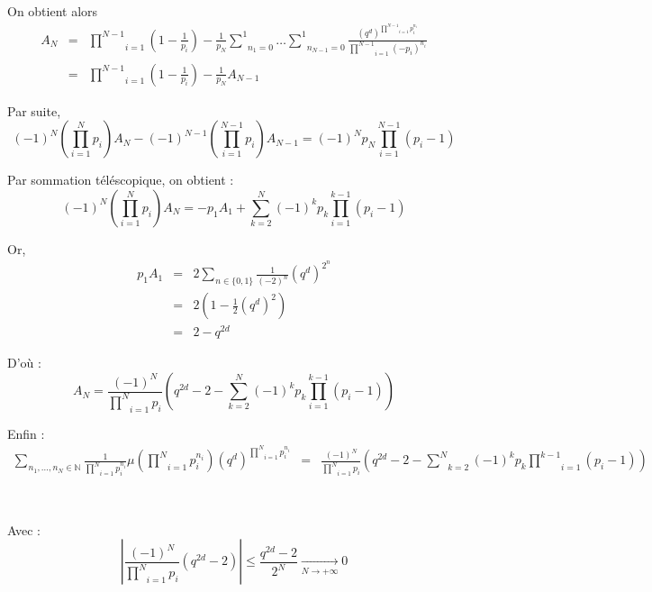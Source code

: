 On obtient alors
\begin{eqnarray*}
  A_N & = & \underset{i = 1}{\overset{N - 1}{\prod}} \left( 1 - \frac{1}{p_i}
  \right) - \frac{1}{p_N} \underset{n_1 = 0}{\overset{1}{\sum}} \ldots
  \underset{n_{N - 1} = 0}{\overset{1}{\sum}} \frac{{(q^d)^{\underset{i =
  1}{\overset{N - 1}{\prod}} p^{n_i}_i}} }{\underset{}{\underset{i =
  1}{\overset{N - 1}{\prod}}} (- p_i)^{n_i}}\\
  & = & \underset{i = 1}{\overset{N - 1}{\prod}} \left( 1 - \frac{1}{p_i}
  \right) - \frac{1}{p_N} A_{N - 1}
\end{eqnarray*}


Par suite,
\[ (- 1)^N \left( \underset{i = 1}{\overset{N}{\prod}} p_i \right) A_N - (-
   1)^{N - 1} \left( \underset{i = 1}{\overset{N - 1}{\prod}} p_i \right) A_{N
   - 1} = (- 1)^N p_N \underset{i = 1}{\overset{N - 1}{\prod}} (p_i - 1) \]


Par sommation t{\'e}l{\'e}scopique, on obtient :
\[ (- 1)^N \left( \underset{i = 1}{\overset{N}{\prod}} p_i \right) A_N = - p_1
   A_1 + \underset{k = 2}{\overset{N}{\sum}} (- 1)^k p_k \underset{i =
   1}{\overset{k - 1}{\prod}} (p_i - 1) \]


Or,
\begin{eqnarray*}
  p_1 A_1 & = & 2 \underset{n  \in \{ 0, 1 \}}{\overset{}{\sum}} \frac{1}{(-
  2)^{n }} (q^d)^{2^n}\\
  & = & 2 \left( 1 - \frac{1}{2} (q^d)^2 \right)\\
  & = & 2 - q^{2 d}
\end{eqnarray*}


D'o{\`u} :
\[ A_N = \frac{(- 1)^N}{\underset{i = 1}{\overset{N}{\prod}} p_i} \left( q^{2
   d} - 2 - \underset{k = 2}{\overset{N}{\sum}} (- 1)^k p_k \underset{i =
   1}{\overset{k - 1}{\prod}} (p_i - 1) \right) \]


Enfin :
\begin{eqnarray*}
  \underset{n_1, \ldots, n_N \in \mathbb{N}}{\overset{}{\sum}}
  \frac{1}{\underset{i = 1}{\overset{N}{\prod}} p^{n_i}_i} \mu \left(
  \underset{i = 1}{\overset{N}{\prod}} p^{n_i}_i \right) (q^d)^{\underset{i =
  1}{\overset{N}{\prod}} p^{n_i}_i} & = & \frac{(- 1)^N}{\underset{i =
  1}{\overset{N}{\prod}} p_i} \left( q^{2 d} - 2 - \underset{k =
  2}{\overset{N}{\sum}} (- 1)^k p_k \underset{i = 1}{\overset{k - 1}{\prod}}
  (p_i - 1) \right)
\end{eqnarray*}


\

Avec :
\[ \left| \frac{(- 1)^N}{\underset{i = 1}{\overset{N}{\prod}} p_i} (q^{2 d} -
   2) \right| \leqslant \frac{q^{2 d} - 2}{2^N} \underset{N \rightarrow +
   \infty}{\rightarrow} 0 \]



